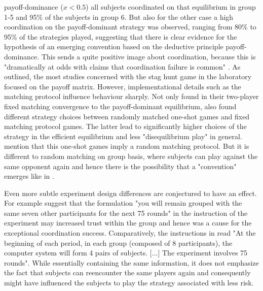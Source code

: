 \documentclass[11pt]{article}
\begin{document}
payoff-dominance ($x < 0.5$) all subjects coordinated on that equilibrium in 
group 1-5 and 95\% of the subjects in group 6. But also for the other case a 
high coordination on the payoff-dominant strategy was observed, ranging from 
80\% to 95\% of the strategies played, suggesting that there is clear evidence
for the hypothesis of an emerging convention based on the deductive principle
payoff-dominance. This sends a quite positive image about coordination, because 
this is "dramatically at odds with claims that coordination failure is common"
\parencite[9]{devetag_when_2007}. 
As outlined, the most studies concerned with the stag hunt game in the 
laboratory focused on the payoff matrix. However, implementational details 
such as the matching protocol influence behaviour sharply. Not only 
\textcite{van_huyck_tacit_1990} found in their two-player fixed matching
convergence to the payoff-dominant equilibrium, 
\textcite{clark_repetition_2001} also found different strategy 
choices between randomly matched one-shot games and fixed matching protocol 
games. The latter lead to significantly higher choices of the strategy 
in the efficient equilibrium and less "disequilibrium play" in general. 
\textcite{devetag_when_2007} mention that this one-shot games imply a 
random matching protocol. But it is different to random matching on group
basis, where subjects can play against the same opponent again 
and hence there is the possibility that a "convention" emerges like in 
\textcite{rankin_strategic_2000}.

Even more subtle experiment design differences are conjectured to have an
effect. For example \textcite{devetag_when_2007} suggest that the formulation
"you will remain grouped with the same seven other participants for the next
75 rounds" in the instruction of the \textcite{rankin_strategic_2000} 
experiment may increased trust within the group and hence was a 
cause for the exceptional coordination success. Comparatively, the 
instructions in \textcite{dubois_optimization_2012} read "At the beginning
of each period, in each group (composed of 8 participants), the computer
system will form 4 pairs of subjects. [...] The experiment 
involves 75 rounds". While essentially containing the same information,
it does not emphasize the fact that subjects can reencounter the same 
players again and consequently might have influenced the subjects to play
the strategy associated with less risk.
\end{document}
